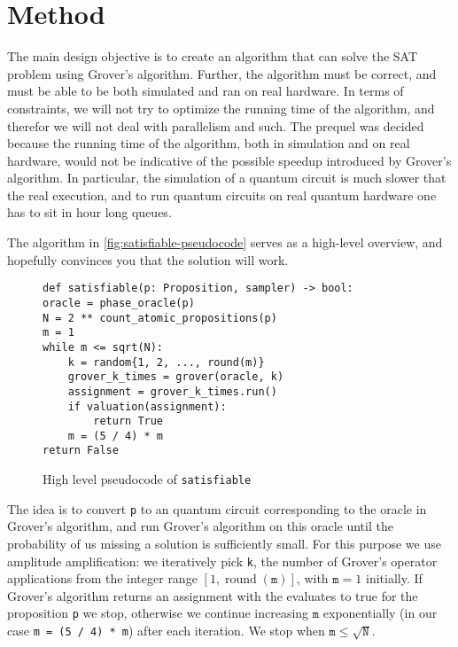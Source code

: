 \section{Method}\label{sec:method}

The main design objective is to create an algorithm that can solve the SAT problem using Grover's algorithm.
Further, the algorithm must be correct, and must be able to be both simulated and ran on real hardware.
In terms of constraints, we will not try to optimize the running time of the algorithm, and therefor we will not deal with parallelism and such.
The prequel was decided because the running time of the algorithm, both in simulation and on real hardware, would not be indicative of the possible speedup introduced by Grover's algorithm.
In particular, the simulation of a quantum circuit is much slower that the real execution, and to run quantum circuits on real quantum hardware one has to sit in hour long queues.

The algorithm in \autoref{fig:satisfiable-pseudocode} serves as a high-level overview, and hopefully convinces you that the solution will work.

\begin{figure}
\centering
\begin{verbatim}
def satisfiable(p: Proposition, sampler) -> bool:
oracle = phase_oracle(p)
N = 2 ** count_atomic_propositions(p)
m = 1
while m <= sqrt(N):
    k = random{1, 2, ..., round(m)}
    grover_k_times = grover(oracle, k)
    assignment = grover_k_times.run()
    if valuation(assignment):
        return True
    m = (5 / 4) * m
return False
\end{verbatim}
\caption{High level pseudocode of \texttt{satisfiable} }
\label{fig:satisfiable-pseudocode}
\end{figure}

The idea is to convert \texttt{p} to an quantum circuit corresponding to the oracle in Grover's algorithm, and run Grover's algorithm  on this oracle until the probability of us missing a solution is sufficiently small.
For this purpose we use amplitude amplification:
we iteratively pick \texttt{k}, the number of Grover's operator applications from the integer range $[1, \operatorname{round}(\texttt{m})]$, with $\texttt{m} = 1$ initially.
If Grover's algorithm returns an assignment with the evaluates to true for the proposition \texttt{p} we stop, otherwise we continue increasing $\texttt{m}$ exponentially (in our case \texttt{m = (5 / 4) * m}) after each iteration.
We stop when $\texttt{m} \leq \sqrt{\texttt{N}}$.
